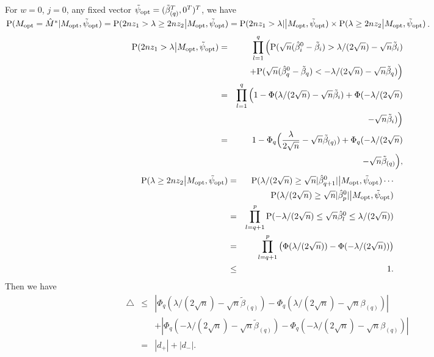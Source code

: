 \documentclass[10pt]{book}
\theoremstyle{definition}
\begin{document}
For $w=0$, $j=0$, any fixed vector $\tilde{\psi}_{\rm opt}=(\tilde{\beta}_{(q)}^T,0^T)^T$, we have ${\rm P}(M_{\rm opt}= \hat{M}^{*}|M_{\rm opt},\tilde{\psi}_{\rm opt})= {\rm P}( 2nz_1>\lambda \geq 2nz_2\big|M_{\rm opt},\tilde{\psi}_{\rm opt} )= {\rm P}( 2nz_1>\lambda|\big|M_{\rm opt},\tilde{\psi}_{\rm opt} )\\ \times {\rm P}( \lambda \geq 2nz_2\big|M_{\rm opt},\tilde{\psi}_{\rm opt} )$. 
\begin{eqnarray}
{\rm P}(2nz_1>\lambda\big| M_{\rm opt},\tilde{\psi}_{\rm opt})
&=&\prod_{l=1}^q\Big({\rm P}(\sqrt{n}(\hat{\beta}^0_i-\tilde{\beta}_i)>\lambda/(2\sqrt{n}) -\sqrt{n} \tilde{\beta}_i)\nonumber\\
&&+{\rm P}(\sqrt{n}(\hat{\beta}^0_q-\tilde{\beta}_q)<-\lambda/(2\sqrt{n}) -\sqrt{n} \tilde{\beta}_q)\Big)\nonumber\\
&=&\prod_{l=1}^q\Big(1-\Phi(\lambda/(2\sqrt{n})- \sqrt{n}\tilde{\beta}_i)+\Phi(-\lambda/(2\sqrt{n})\nonumber\\
&&-\sqrt{n}\tilde{\beta}_i)\Big)\nonumber\\
&=&1-\Phi_q\Big(\frac{\lambda}{2\sqrt{n}}- \sqrt{n}\tilde{\beta}_{(q)})+\Phi_q(-\lambda/(2\sqrt{n})\nonumber\\
&&-\sqrt{n}\tilde{\beta}_{(q)}\Big),\label{type1}
\end{eqnarray}
\begin{eqnarray}
{\rm P}(\lambda\geq2nz_2\big| M_{\rm opt},\tilde{\psi}_{\rm opt})&=&{\rm P}(\lambda/(2 \sqrt{n})\geq \sqrt{n}|\hat{\beta}^0_{q+1}|\big| M_{\rm opt},\tilde{\psi}_{\rm opt})\cdots \nonumber\\
&&{\rm P}(\lambda/(2\sqrt{n})\geq \sqrt{n}|\hat{\beta}^0_{p}
|\big| M_{\rm opt},\tilde{\psi}_{\rm opt})\nonumber\\
&=&\prod_{l=q+1}^p {\rm P}( -\lambda/(2\sqrt{n}) \leq \sqrt{n}\hat{\beta}^0_{l}\leq \lambda/(2\sqrt{n}))\nonumber\\
&=&\prod_{l=q+1}^p \big(\Phi(\lambda/(2\sqrt{n}))-\Phi(-\lambda/(2\sqrt{n})) \big)\nonumber\\
&\leq& 1.\label{type2}
\end{eqnarray}
Then we have
\begin{eqnarray}
\triangle&\leq& |\Phi_q(\lambda/(2\sqrt{n})- \sqrt{n}\tilde{\beta}_{(q)})-\Phi_q(\lambda/(2\sqrt{n})- \sqrt{n}\beta_{(q)})| \nonumber \\
&&+|\Phi_q(-\lambda/(2\sqrt{n})-\sqrt{n}\tilde{\beta}_{(q)})-\Phi_q(-\lambda/(2\sqrt{n})-\sqrt{n}\beta_{(q)})|\nonumber \\
&=&|d_{+}|+|d_{-}|.
\end{eqnarray}
\end{document}
